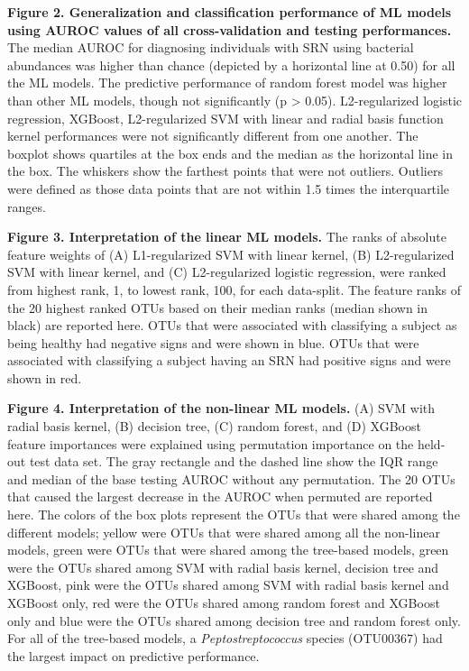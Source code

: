 \documentclass[
  11pt,
]{article}
\begin{document}
\hfill\break

\textbf{Figure 2. Generalization and classification performance of ML
models using AUROC values of all cross-validation and testing
performances.} The median AUROC for diagnosing individuals with SRN
using bacterial abundances was higher than chance (depicted by a
horizontal line at 0.50) for all the ML models. The predictive
performance of random forest model was higher than other ML models,
though not significantly (p \textgreater{} 0.05). L2-regularized
logistic regression, XGBoost, L2-regularized SVM with linear and radial
basis function kernel performances were not significantly different from
one another. The boxplot shows quartiles at the box ends and the median
as the horizontal line in the box. The whiskers show the farthest points
that were not outliers. Outliers were defined as those data points that
are not within 1.5 times the interquartile ranges.

\hfill\break

\textbf{Figure 3. Interpretation of the linear ML models.} The ranks of
absolute feature weights of (A) L1-regularized SVM with linear kernel,
(B) L2-regularized SVM with linear kernel, and (C) L2-regularized
logistic regression, were ranked from highest rank, 1, to lowest rank,
100, for each data-split. The feature ranks of the 20 highest ranked
OTUs based on their median ranks (median shown in black) are reported
here. OTUs that were associated with classifying a subject as being
healthy had negative signs and were shown in blue. OTUs that were
associated with classifying a subject having an SRN had positive signs
and were shown in red.

\hfill\break

\textbf{Figure 4. Interpretation of the non-linear ML models.} (A) SVM
with radial basis kernel, (B) decision tree, (C) random forest, and (D)
XGBoost feature importances were explained using permutation importance
on the held-out test data set. The gray rectangle and the dashed line
show the IQR range and median of the base testing AUROC without any
permutation. The 20 OTUs that caused the largest decrease in the AUROC
when permuted are reported here. The colors of the box plots represent
the OTUs that were shared among the different models; yellow were OTUs
that were shared among all the non-linear models, green were OTUs that
were shared among the tree-based models, green were the OTUs shared
among SVM with radial basis kernel, decision tree and XGBoost, pink were
the OTUs shared among SVM with radial basis kernel and XGBoost only, red
were the OTUs shared among random forest and XGBoost only and blue were
the OTUs shared among decision tree and random forest only. For all of
the tree-based models, a \emph{Peptostreptococcus} species (OTU00367)
had the largest impact on predictive performance.
\end{document}
